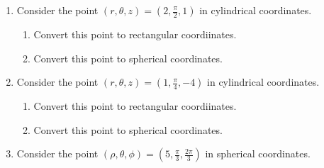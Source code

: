\documentclass[12pt]{article}
\newif\ifans
\begin{document}
\begin{enumerate}

\item Consider the point $(r,\theta,z)=\left(2, \frac{\pi}{2}, 1\right)$ in cylindrical coordinates.

\begin{enumerate}

\item Convert this point to rectangular coordiinates.

\ifans{\fbox{{$(x,y,z)=(0,2,1)$}} \fi

\item Convert this point to spherical coordinates.

\ifans{\fbox{{$(\rho, \theta, \phi)=\left(\sqrt{5}, \frac{\pi}{2}, \cos^{-1}\frac{1}{\sqrt{5}}\right)$}} \fi

\end{enumerate}

\item Consider the point $(r,\theta,z)=\left(1, \frac{\pi}{4}, -4\right)$ in cylindrical coordinates.

\begin{enumerate}

\item Convert this point to rectangular coordiinates.

\ifans{\fbox{{$(x,y,z)=\left(\frac{\sqrt{2}}{2},\frac{\sqrt{2}}{2},-4\right)$}} \fi

\item Convert this point to spherical coordinates.

\ifans{\fbox{{$(\rho, \theta, \phi)=\left(\sqrt{17}, \frac{\pi}{4}, \cos^{-1}\left(-\frac{4}{\sqrt{17}}\right)\right)$}} \fi

\end{enumerate}

\item Consider the point $(\rho,\theta,\phi)=\left(5, \frac{\pi}{3}, \frac{2\pi}{3}\right)$ in spherical coordinates.

\end{enumerate}
\end{document}
